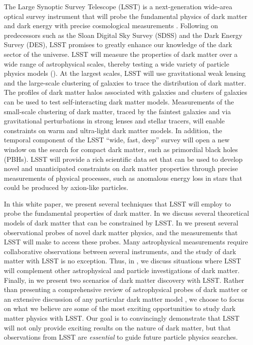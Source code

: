 The Large Synoptic Survey Telescope (LSST) is a next-generation wide-area optical survey instrument that will probe the fundamental physics of dark matter and dark energy with precise cosmological measurements \citep{0805.2366}. 
Following on predecessors such as the Sloan Digital Sky Survey (SDSS) and the Dark Energy Survey (DES), LSST promises to greatly enhance our knowledge of the dark sector of the universe. 
LSST will measure the properties of dark matter over a wide range of astrophysical scales, thereby testing a wide variety of particle physics models ().
At the largest scales, LSST will use gravitational weak lensing and the large-scale clustering of galaxies to trace the distribution of dark matter.
The profiles of dark matter halos associated with galaxies and clusters of galaxies can be used to test self-interacting dark matter models.
Measurements of the small-scale clustering of dark matter, traced by the faintest galaxies and via gravitational perturbations in strong lenses and stellar tracers, will enable constraints on warm and ultra-light dark matter models.
In addition, the temporal component of the LSST ``wide, fast, deep'' survey will open a new window on the search for compact dark matter, such as primordial black holes (PBHs).
LSST will provide a rich scientific data set that can be used to develop novel and unanticipated constraints on dark matter properties through precise measurements of physical processes, such as anomalous energy loss in stars that could be produced by axion-like particles.

In this white paper, we present several techniques that LSST will employ to probe the fundamental properties of dark matter. 
In  we discuss several theoretical models of dark matter that can be constrained by LSST.
In  we present several observational probes of novel dark matter physics, and the  measurements that LSST will make to access these probes.
Many astrophysical measurements require collaborative observations between several instruments, and the study of dark matter with LSST is no exception. 
Thus, in , we discuss situations where LSST will complement other astrophysical and particle investigations of dark matter.
Finally, in  we present two scenarios of dark matter discovery with LSST.
Rather than presenting a comprehensive review of astrophysical probes of dark matter  \citep[e.g.,][]{BuckleyPeter:2017} or an extensive discussion of any particular dark matter model \citep[e.g.,][]{Jain:2019}, we choose to focus on what we believe are some of the most exciting opportunities to study dark matter physics with LSST. 
Our goal is to convincingly demonstrate that LSST will not only provide exciting results on the nature of dark matter, but that observations from LSST are {\it essential} to guide future particle physics searches.

